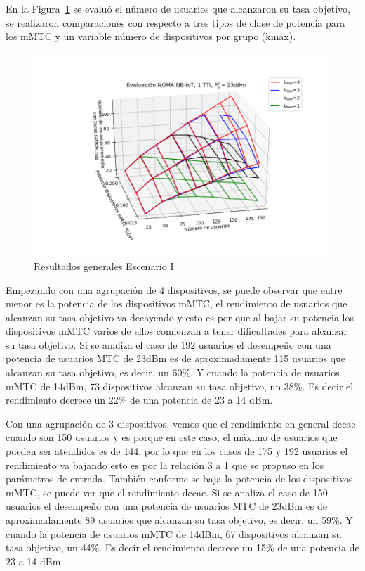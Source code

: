 En la Figura~\ref{fig:NOMA_evaluacion_K_Pm_Variable_3D} se evaluó el número de usuarios que alcanzaron su tasa objetivo, se realizaron comparaciones con respecto a tres tipos de clase de potencia para los mMTC y un variable número de dispositivos por grupo (kmax).\newline

\begin{figure}[th]
    \centering
    \includegraphics[scale=.7]{Figures/ResultadosNOMA/NOMA_evaluacion_K_Pm_Variable_3D.png}
    \decoRule
    \caption[Resultados generales Escenario I]{Resultados generales Escenario I}
    \label{fig:NOMA_evaluacion_K_Pm_Variable_3D}
\end{figure}

Empezando con una agrupación de 4 dispositivos, se puede observar que entre menor es la potencia de los dispositivos mMTC, el rendimiento de usuarios que alcanzan su tasa objetivo va decayendo y esto es por que al bajar su potencia los dispositivos mMTC varios de ellos comienzan a tener dificultades para alcanzar su tasa objetivo. Si se analiza el caso de 192 usuarios el desempeño con una potencia de usuarios MTC de 23dBm es de aproximadamente 115 usuarios que alcanzan su tasa objetivo, es decir, un 60\%. Y cuando la potencia de usuarios mMTC de 14dBm, 73 dispositivos alcanzan su tasa objetivo, un 38\%. Es decir el rendimiento decrece un 22\% de una potencia de 23 a 14 dBm.\newline

Con una agrupación de 3 dispositivos, vemos que el rendimiento en general decae cuando son 150 usuarios y es porque en este caso, el máximo de usuarios que pueden ser atendidos es de 144, por lo que en los casos de 175 y 192 usuarios el rendimiento va bajando esto es por la relación 3 a 1 que se propuso en los parámetros de entrada. También conforme se baja la potencia de los dispositivos mMTC, se puede ver que el rendimiento decae. Si se analiza el caso de 150 usuarios el desempeño con una potencia de usuarios MTC de 23dBm es de aproximadamente 89 usuarios que alcanzan su tasa objetivo, es decir, un 59\%. Y cuando la potencia de usuarios mMTC de 14dBm, 67 dispositivos alcanzan su tasa objetivo, un 44\%. Es decir el rendimiento decrece un 15\% de una potencia de 23 a 14 dBm.\newline

